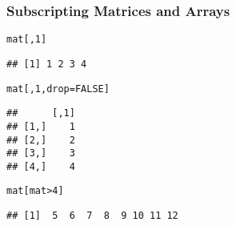 \documentclass[paper=screen,mathserif]{beamer}\usepackage[]{graphicx}\usepackage[]{color}
\makeatletter
\newcommand{\hlnum}[1]{\textcolor[rgb]{0.686,0.059,0.569}{#1}}%
\newcommand{\hlopt}[1]{\textcolor[rgb]{0,0,0}{#1}}%
\newcommand{\hlstd}[1]{\textcolor[rgb]{0.345,0.345,0.345}{#1}}%
\newcommand{\hlkwc}[1]{\textcolor[rgb]{0.333,0.667,0.333}{#1}}%
\newenvironment{kframe}{%
 \def\at@end@of@kframe{}%
 \ifinner\ifhmode%
  \def\at@end@of@kframe{\end{minipage}}%
  \begin{minipage}{\columnwidth}%
 \fi\fi%
 \def\FrameCommand##1{\hskip\@totalleftmargin \hskip-\fboxsep
 \colorbox{shadecolor}{##1}\hskip-\fboxsep
     \hskip-\linewidth \hskip-\@totalleftmargin \hskip\columnwidth}%
 \MakeFramed {\advance\hsize-\width
   \@totalleftmargin\z@ \linewidth\hsize
   \@setminipage}}%
 {\par\unskip\endMakeFramed%
 \at@end@of@kframe}
\newenvironment{knitrout}{}{} %
\newcommand{\ft}[1]{\frametitle{#1}}
\makeatother
\begin{document}
\begin{frame}[fragile]
  \ft{Subscripting Matrices and Arrays}

\begin{knitrout}\scriptsize
{}\color{fgcolor}\begin{kframe}
\begin{alltt}
\hlstd{mat[,} \hlnum{1}\hlstd{]}
\end{alltt}
\begin{verbatim}
## [1] 1 2 3 4
\end{verbatim}
\end{kframe}
\end{knitrout}

\begin{knitrout}\scriptsize
{}\color{fgcolor}\begin{kframe}
\begin{alltt}
\hlstd{mat[,} \hlnum{1}\hlstd{,} \hlkwc{drop} \hlstd{=} \hlnum{FALSE}\hlstd{]}
\end{alltt}
\begin{verbatim}
##      [,1]
## [1,]    1
## [2,]    2
## [3,]    3
## [4,]    4
\end{verbatim}
\end{kframe}
\end{knitrout}

\begin{knitrout}\scriptsize
{}\color{fgcolor}\begin{kframe}
\begin{alltt}
\hlstd{mat[mat} \hlopt{>} \hlnum{4}\hlstd{]}
\end{alltt}
\begin{verbatim}
## [1]  5  6  7  8  9 10 11 12
\end{verbatim}
\end{kframe}
\end{knitrout}
\end{frame}
\end{document}
